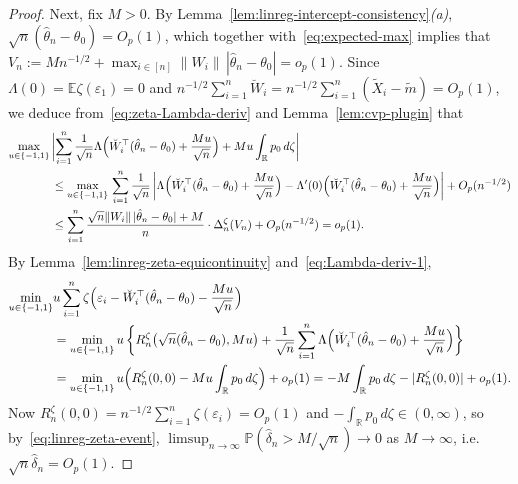 \documentclass[a4paper]{article}
\newcommand{\R}{\mathbb{R}}
\newcommand{\E}{\mathbb{E}}
\renewcommand{\Pr}{\mathbb{P}}
\newcommand{\norm}[1]{\|{#1}\|}
\theoremstyle{definition}
\begin{document}
\begin{proof}
Next, fix $M > 0$. By Lemma~\ref{lem:linreg-intercept-consistency}\textit{(a)}, $\sqrt{n}(\hat{\theta}_n - \theta_0) = O_p(1)$, which together with~\eqref{eq:expected-max} implies that $V_n := Mn^{-1/2} + \max_{i \in [n]}\norm{W_i}\,|\hat{\theta}_n - \theta_0| = o_p(1)$. Since $\Lambda(0) = \E\zeta(\varepsilon_1) = 0$ and $n^{-1/2}\sum_{i=1}^n \breve{W}_i = n^{-1/2}\sum_{i=1}^n (\tilde{X}_i - \tilde{m}) = O_p(1)$, we deduce from~\eqref{eq:zeta-Lambda-deriv} and Lemma~\ref{lem:cvp-plugin} that
\begin{align}
\max_{u \in \{-1,1\}}\,&\biggl|\sum_{i=1}^n \frac{1}{\sqrt{n}}\Lambda\Bigl(\breve{W}_i^\top(\hat{\theta}_n - \theta_0) + \frac{Mu}{\sqrt{n}}\Bigr) + Mu\int_\R p_0\,d\zeta\biggr| \notag \\
&\leq \max_{u \in \{-1,1\}}\,\sum_{i=1}^n \frac{1}{\sqrt{n}} \,\biggl|\Lambda\Bigl(\breve{W}_i^\top(\hat{\theta}_n - \theta_0) + \frac{Mu}{\sqrt{n}}\Bigr) - \Lambda'(0)\Bigl(\breve{W}_i^\top(\hat{\theta}_n - \theta_0) + \frac{Mu}{\sqrt{n}}\Bigr)\biggr| + O_p(n^{-1/2}) \notag \\
\label{eq:Lambda-deriv-1}
&\leq \sum_{i=1}^n \frac{\sqrt{n}\norm{W_i}\,|\hat{\theta}_n - \theta_0| + M}{n} \cdot \Delta_n^\zeta(V_n) + O_p(n^{-1/2}) = o_p(1).
\end{align}
By Lemma~\ref{lem:linreg-zeta-equicontinuity} and~\eqref{eq:Lambda-deriv-1},
\begin{align*}
\min_{u \in \{-1,1\}} &u\sum_{i=1}^n \zeta\Bigl(\varepsilon_i - \breve{W}_i^\top(\hat{\theta}_n - \theta_0) - \frac{Mu}{\sqrt{n}}\Bigr) \\
&= \min_{u \in \{-1,1\}} u\,\biggl\{R_n^\zeta\bigl(\sqrt{n}(\hat{\theta}_n - \theta_0),Mu\bigr) + \frac{1}{\sqrt{n}}\sum_{i=1}^n \Lambda\Bigl(\breve{W}_i^\top(\hat{\theta}_n - \theta_0) + \frac{Mu}{\sqrt{n}}\Bigr)\biggr\} \\
&= \min_{u \in \{-1,1\}} u\Bigl(R_n^\zeta(0,0) - Mu\int_\R p_0\,d\zeta\Bigr) + o_p(1) = -M\int_\R p_0\,d\zeta - |R_n^\zeta(0,0)| + o_p(1).
\end{align*}
Now $R_n^\zeta(0,0) = n^{-1/2}\sum_{i=1}^n \zeta(\varepsilon_i) = O_p(1)$ and $-\int_\R p_0\,d\zeta \in (0,\infty)$, so by~\eqref{eq:linreg-zeta-event}, $\limsup_{n \to \infty}\Pr(\hat{\delta}_n > M/\sqrt{n}) \to 0$ as $M \to \infty$, i.e.~$\sqrt{n}\hat{\delta}_n = O_p(1)$. 


\end{proof}
\end{document}
